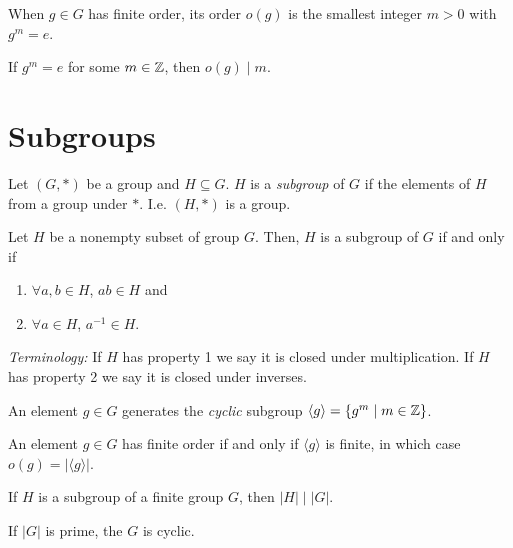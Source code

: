 \documentclass{amsart}
\begin{document}
\begin{notation}
	When $g \in G$ has finite order, its order $o(g)$ is the smallest integer $m >
	0$ with $g^m = e$.
\end{notation}

\begin{notation}
	If $g^m = e$ for some $m \in {\mathbb{Z}}$, then $o(g) \mid m$.
\end{notation}

\section*{Subgroups}

\begin{definition}
		Let $(G, *)$ be a group and $H \subseteq G$. $H$ is a \emph{subgroup} of $G$
		if the elements of $H$ from a group under $*$. I.e. $(H, *)$ is a group.
\end{definition}

\begin{theorem}
		Let $H$ be a nonempty subset of group $G$. Then, $H$ is a subgroup of $G$ if
		and only if
    \begin{enumerate}
        \item $\forall a,b \in H$, $ab \in H$ and
        \item $\forall a \in H$, $a^{-1} \in H$.
    \end{enumerate}
		\emph{Terminology:} If $H$ has property 1 we say it is closed under
		multiplication. If $H$ has property 2 we say it is closed under inverses.
\end{theorem}

\begin{definition}
	An element $g \in G$ generates the \emph{cyclic} subgroup $\langle g
	\rangle = \{g^m \mid m \in {\mathbb{Z}}\}$.
\end{definition}

\begin{theorem}
	An element $g \in G$ has finite order if and only if $\langle g \rangle$ is
	finite, in which case $o(g) = |\langle g \rangle|$.
\end{theorem}

\begin{theorem}
	If $H$ is a subgroup of a finite group $G$, then $|H| \mid |G|$.
\end{theorem}

\begin{corollary}
	If $|G|$ is prime, the $G$ is cyclic.
\end{corollary}
\end{document}
